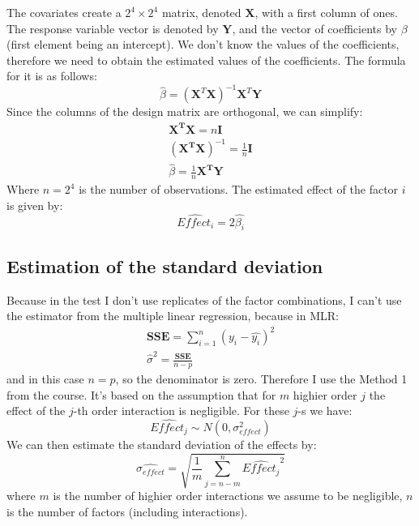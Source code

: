 \documentclass{article}
\begin{document}
The covariates create a $2^4\times2^4$ matrix, denoted $\mathbf{X}$, with a first column of ones. The response variable vector is denoted by $\mathbf{Y}$, and the vector of coefficients by $\beta$ (first element being an intercept). We don't know the values of the coefficients, therefore we need to obtain the estimated values of the coefficients. The formula for it is as follows:
\begin{equation}
    \hat{\beta} = (\mathbf{X}^T \mathbf{X})^{-1} \mathbf{X}^T \mathbf{Y}
\end{equation}
Since the columns of the design matrix are orthogonal, we can simplify:
\begin{align}
    \mathbf{X^TX} = n\mathbf{I}                              \\
    \left(\mathbf{X^TX} \right)^{-1} = \frac{1}{n}\mathbf{I} \\
    \hat{\beta} = \frac{1}{n}\mathbf{X^TY}
\end{align}
Where $n=2^4$ is the number of observations. The estimated effect of the factor $i$ is given by:
\begin{equation}
    \widehat{Effect_i} = 2\hat{\beta_i}
\end{equation}

\subsection{Estimation of the standard deviation}
\label{subsec:std_estim}

Because in the test I don't use replicates of the factor combinations, I can't use the estimator from the multiple linear regression, because in MLR:
\begin{align}
    \mathbf{SSE} = \sum_{i=1}^{n} \left(y_i - \hat{y_i} \right)^2 \\
    \hat{\sigma}^2 = \frac{\mathbf{SSE}}{n-p}
\end{align}
and in this case $n=p$, so the denominator is zero. Therefore I use the Method 1 from the course. It's based on the assumption that for $m$ highier order $j$ the effect of the $j$-th order interaction is negligible. For these $j$-s we have:
\begin{equation}
    \widehat{Effect_j} \sim N(0, \sigma_{effect}^2)
\end{equation}
We can then estimate the standard deviation of the effects by:
\begin{equation}
    \widehat{\sigma_{effect}} = \sqrt{\frac{1}{m} \sum_{j=n-m}^{n} \widehat{Effect_j}^2}
\end{equation}
where $m$ is the number of highier order interactions we assume to be negligible, $n$ is the number of factors (including interactions).
\end{document}
